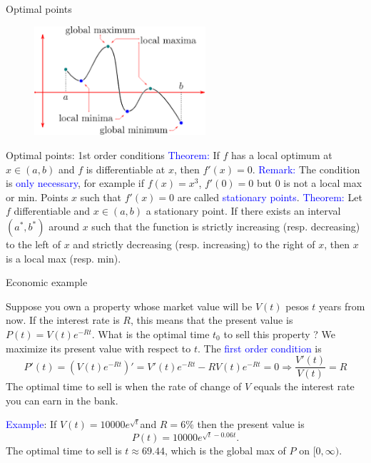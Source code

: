 \documentclass[11pt,aspectratio=169]{beamer}
\begin{document}
\begin{frame}{Optimal points}
\begin{figure}
\includegraphics[width=2.5in]{img/max_min} 
\end{figure}
\end{frame}

\begin{frame}{Optimal points: 1st order conditions}
 \textcolor{blue}{Theorem:} If $f$ has a local optimum at $x \in (a,b)$ and $f$ is differentiable at $x$, then $f'(x)=0$.
\vskip 12pt
\textcolor{blue}{Remark:} The condition is \textcolor{blue}{only necessary}, for example if $f(x)=x^3$, $f'(0)=0$ but $0$ is not a local max or min.
\vskip 12pt
Points $x$ such that $f'(x)=0$ are called \textcolor{blue}{stationary points}.
\vskip 12pt
\textcolor{blue}{Theorem:} Let $f$ differentiable and $x \in (a,b)$ a stationary point. If there exists an interval $(a^{\ast}, b^{\ast})$ around $x$ such that the function is strictly increasing (resp. decreasing) to the left of $x$ and strictly decreasing (resp. increasing) to the right of $x$, then $x$ is a local max (resp. min).
\end{frame}


\begin{frame}{Economic example}

Suppose you own a property whose market value will be $V(t)$ pesos $t$ years from now. If the interest rate is $R$, this means that the present value is $P(t)=V(t) e^{-Rt}$.
What is the optimal time $t_0$ to sell this property ? We maximize its present value with respect  to $t$.
\vskip 12pt
The \textcolor{blue}{first order condition} is
$$
P'(t)=(V(t) e^{-Rt})'=V'(t) e^{-Rt}-RV(t) e^{-Rt}=0 \Rightarrow \frac{V'(t)}{V(t)}=R
$$ 
The optimal time to sell is when the rate of change of $V$ equals the interest rate you can earn in the bank.
\vskip 12pt

 \textcolor{blue}{Example}: If $V(t)=10000e^{\sqrt{t}}$and $R=6\%$ then the present value is 
$$
P(t)=10000e^{\sqrt{t}-0.06 t}.
$$
The optimal time to sell is $t \approx 69.44$, which is the global max of $P$ on $[0, \infty)$.
\end{frame}
\end{document}
